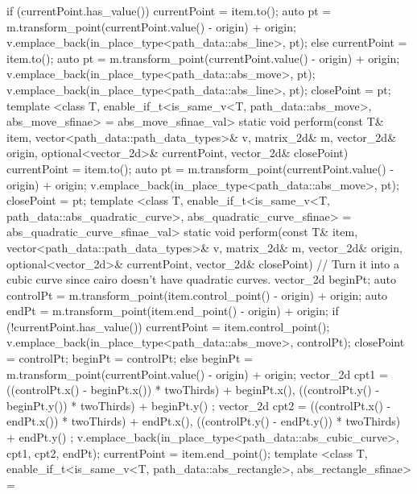 \begin{codeblock}
{{{        if (currentPoint.has_value()) {
          currentPoint = item.to();
          auto pt = m.transform_point(currentPoint.value() - origin) + origin;
          v.emplace_back(in_place_type<path_data::abs_line>, pt);
        }
        else {
          currentPoint = item.to();
          auto pt = m.transform_point(currentPoint.value() - origin) + origin;
          v.emplace_back(in_place_type<path_data::abs_move>, pt);
          v.emplace_back(in_place_type<path_data::abs_line>, pt);
          closePoint = pt;
        }
      }
      template <class T, enable_if_t<is_same_v<T, path_data::abs_move>, 
        abs_move_sfinae> = abs_move_sfinae_val>
      static void perform(const T& item, vector<path_data::path_data_types>& v, 
        matrix_2d& m, vector_2d& origin, optional<vector_2d>& currentPoint, 
        vector_2d& closePoint) {
        currentPoint = item.to();
        auto pt = m.transform_point(currentPoint.value() - origin) + origin;
        v.emplace_back(in_place_type<path_data::abs_move>, pt);
        closePoint = pt;
      }
      template <class T, enable_if_t<is_same_v<T, 
        path_data::abs_quadratic_curve>, abs_quadratic_curve_sfinae> = 
        abs_quadratic_curve_sfinae_val>
      static void perform(const T& item, vector<path_data::path_data_types>& v, 
        matrix_2d& m, vector_2d& origin, optional<vector_2d>& currentPoint, 
        vector_2d& closePoint) {
        // Turn it into a cubic curve since cairo doesn't have quadratic curves.
        vector_2d beginPt;
        auto controlPt = m.transform_point(item.control_point() - origin) + 
          origin;
        auto endPt = m.transform_point(item.end_point() - origin) + origin;
        if (!currentPoint.has_value()) {
          currentPoint = item.control_point();
          v.emplace_back(in_place_type<path_data::abs_move>, controlPt);
          closePoint = controlPt;
          beginPt = controlPt;
        }
        else {
          beginPt = m.transform_point(currentPoint.value() - origin) + origin;
        }
        vector_2d cpt1 = { ((controlPt.x() - beginPt.x()) * twoThirds) + 
          beginPt.x(), ((controlPt.y() - beginPt.y()) * twoThirds) + 
          beginPt.y() };
        vector_2d cpt2 = { ((controlPt.x() - endPt.x()) * twoThirds) + 
          endPt.x(), ((controlPt.y() - endPt.y()) * twoThirds) + endPt.y() };
        v.emplace_back(in_place_type<path_data::abs_cubic_curve>, cpt1, cpt2, 
          endPt);
        currentPoint = item.end_point();
      }
      template <class T, enable_if_t<is_same_v<T, 
        path_data::abs_rectangle>, abs_rectangle_sfinae> = 
}}
\end{codeblock}
